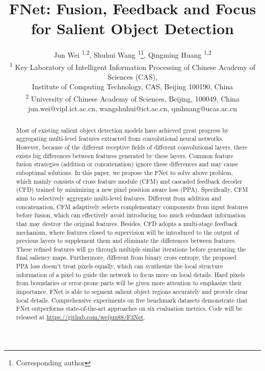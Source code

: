 \documentclass[letterpaper]{article} \usepackage{aaai20}  \usepackage{times}  \usepackage{helvet} \usepackage{courier}  \usepackage[hyphens]{url}  \usepackage{graphicx} \urlstyle{rm} \def\UrlFont{\rm}  \usepackage{graphicx}  \frenchspacing  \setlength{\pdfpagewidth}{8.5in}  \setlength{\pdfpageheight}{11in}
\title{FNet: Fusion, Feedback and Focus for Salient Object Detection}
\author{ Jun Wei          \textsuperscript{\rm 1,2}, 
         Shuhui Wang      \textsuperscript{\rm 1}\thanks{Corresponding author}, 
         Qingming Huang   \textsuperscript{\rm 1,2} \\
         \textsuperscript{\rm 1} Key Laboratory of Intelligent Information Processing of Chinese Academy of Sciences (CAS), \\ Institute of Computing Technology, CAS, Beijing 100190, China \\
         \textsuperscript{\rm 2} University of Chinese Academy of Sciences, Beijing, 100049, China \\ 
         jun.wei@vipl.ict.ac.cn, wangshuhui@ict.ac.cn, qmhuang@ucas.ac.cn\\
}
\begin{document}
\maketitle

\begin{abstract}
Most of existing salient object detection models have achieved great progress by aggregating multi-level features extracted from convolutional neural networks. However, because of the different receptive fields of different convolutional layers, there exists big differences between features generated by these layers. Common feature fusion strategies (addition or concatenation) ignore these differences and may cause suboptimal solutions. In this paper, we propose the FNet to solve above problem, which mainly consists of cross feature module (CFM) and cascaded feedback decoder (CFD) trained by minimizing a new pixel position aware loss (PPA). Specifically, CFM aims to selectively aggregate multi-level features. Different from addition and concatenation, CFM adaptively selects complementary components from input features before fusion, which can effectively avoid introducing too much redundant information that may destroy the original features. Besides, CFD adopts a multi-stage feedback mechanism, where features closed to supervision will be introduced to the output of previous layers to supplement them and eliminate the differences between features. These refined features will go through multiple similar iterations before generating the final saliency maps. Furthermore, different from binary cross entropy, the proposed PPA loss doesn’t treat pixels equally, which can synthesize the local structure information of a pixel to guide the network to focus more on local details. Hard pixels from boundaries or error-prone parts will be given more attention to emphasize their importance. FNet is able to segment salient object regions accurately and provide clear local details. Comprehensive experiments on five benchmark datasets demonstrate that FNet outperforms state-of-the-art approaches on six evaluation metrics. Code will be released at \url{https://github.com/weijun88/F3Net}.
\end{abstract}
\end{document}
